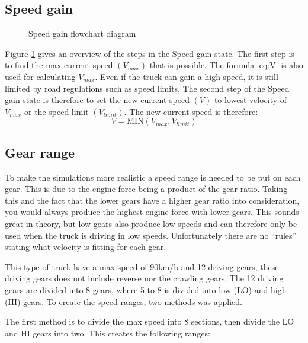\documentclass[noprint]{uit-thesis}
\begin{document}
\subsection{Speed gain}
\begin{figure} [H]
\centering

\caption{Speed gain flowchart diagram}
\label{fig:SpeedGainDiagram}
\end{figure}


Figure \ref{fig:SpeedGainDiagram} gives an overview of the steps in the Speed gain state. The first step is to find the max current speed $(V_{max})$ that is possible. The formula \ref{eq:V} is also used for calculating $V_{max}$. Even if the truck can gain a high speed, it is still limited by road regulations such as speed limits. The second step of the Speed gain state is therefore to set the new current speed $(V)$ to lowest velocity of $V_{max}$ or the speed limit $(V_{limit})$. The new current speed is therefore: 
\begin{equation}
\label{eq:Speed}
V= \text{MIN}(V_{max}, V_{limit})
\end{equation}

\subsection{Gear range}
To make the simulations more realistic a speed range is needed to be put on each gear. This is due to the engine force being a product of the gear ratio. Taking this and the fact that the lower gears have a higher gear ratio into consideration, you would always produce the highest engine force with lower gears. This sounds great in theory, but low gears also produce low speeds and can therefore only be used when the truck is driving in low speeds. Unfortunately there are no “rules” stating what velocity is fitting for each gear.
\par
This type of truck have a max speed of 90km/h and 12 driving gears, these driving gears does not include reverse nor the crawling gears. The 12 driving gears are divided into 8 gears, where 5 to 8 is divided into low (LO) and high (HI) gears. To create the speed ranges, two methods was applied.
\par
The first method is to divide the max speed into 8 sections, then divide the LO and HI gears into two. This creates the following ranges: 
\end{document}
